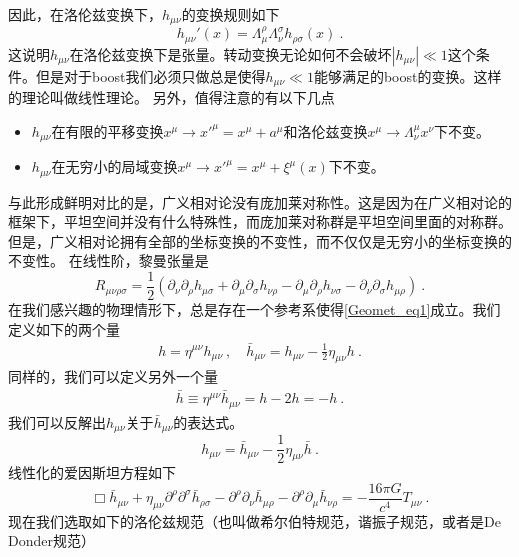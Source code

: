 因此，在洛伦兹变换下，$h_{\mu\nu}$的变换规则如下
\begin{equation}
h_{\mu\nu}'(x) = \Lambda^\rho_\mu\Lambda^\sigma_\nu h_{\rho\sigma} (x) ~. 
\end{equation}
这说明$h_{\mu\nu}$在洛伦兹变换下是张量。转动变换无论如何不会破坏$|h_{\mu\nu}|\ll 1$这个条件。但是对于boost我们必须只做总是使得$h_{\mu\nu}\ll 1$能够满足的boost的变换。这样的理论叫做线性理论。
另外，值得注意的有以下几点
\begin{itemize}
\item $h_{\mu\nu}$在有限的平移变换$x^\mu\rightarrow x'^\mu = x^\mu + a^\mu$和洛伦兹变换$x^\mu\rightarrow \Lambda^\mu_\nu x^\nu$下不变。
\item $h_{\mu\nu}$在无穷小的局域变换$x^\mu \rightarrow x'^\mu = x^\mu + \xi^\mu (x)$下不变。
\end{itemize}
与此形成鲜明对比的是，广义相对论没有庞加莱对称性。这是因为在广义相对论的框架下，平坦空间并没有什么特殊性，而庞加莱对称群是平坦空间里面的对称群。但是，广义相对论拥有全部的坐标变换的不变性，而不仅仅是无穷小的坐标变换的不变性。
在线性阶，黎曼张量是
\begin{equation}
R_{\mu\nu\rho\sigma} = \frac{1}{2}  (\partial_\nu\partial_\rho h_{\mu\sigma} + \partial_\mu\partial_\sigma h_{\nu\rho} - \partial_\mu\partial_\rho h_{\nu\sigma} - \partial_\nu\partial_\sigma h_{\mu\rho}  ) ~.
\end{equation} 
在我们感兴趣的物理情形下，总是存在一个参考系使得\autoref{Geomet_eq1}成立。我们定义如下的两个量 
\begin{align}
h = \eta^{\mu\nu} h_{\mu\nu} ~, \quad \bar h_{\mu\nu} = h_{\mu\nu} - \frac{1}{2} \eta_{\mu\nu} h~.
\end{align}
同样的，我们可以定义另外一个量
\begin{align}
\bar h \equiv \eta^{\mu\nu} \bar h_{\mu\nu} = h - 2 h = -h~.
\end{align}
我们可以反解出$h_{\mu\nu}$关于$\bar h_{\mu\nu}$的表达式。
\begin{equation}
h_{\mu\nu} = \bar h_{\mu\nu} - \frac{1}{2} \eta_{\mu\nu} \bar h ~. 
\end{equation}
线性化的爱因斯坦方程如下
\begin{equation}\label{Geomet_eq2}
\Box \bar h_{\mu\nu} + \eta_{\mu\nu} \partial^\rho \partial^\sigma \bar h_{\rho\sigma} - \partial^\rho \partial_\nu \bar h_{\mu\rho} - \partial^\rho\partial_\mu \bar h_{\nu\rho} = - \frac{16\pi G}{c^4} T_{\mu\nu} ~. 
\end{equation}
现在我们选取如下的洛伦兹规范（也叫做希尔伯特规范，谐振子规范，或者是De Donder规范）
